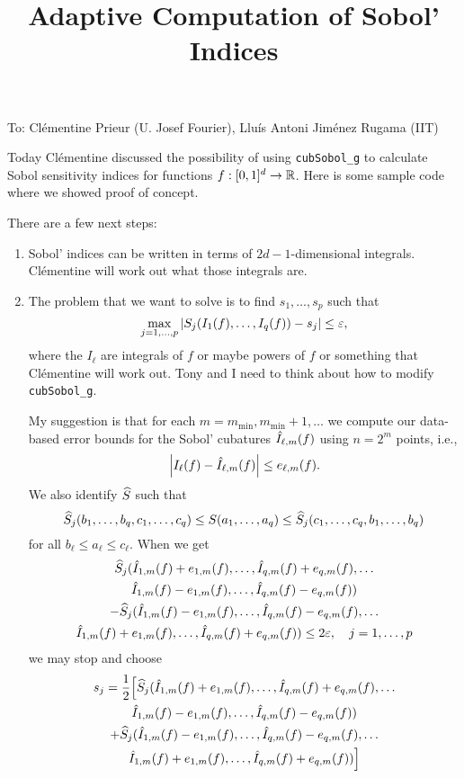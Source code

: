 \documentclass[]{amsart}
\newcommand{\oerr}{e}
\begin{document}
\title{Adaptive Computation of Sobol' Indices}
\maketitle

\noindent To:  Cl\'ementine Prieur (U. Josef Fourier), Llu\'is Antoni Jim\'enez Rugama (IIT)

\bigskip

Today Cl\'ementine discussed the possibility of using \texttt{cubSobol\_g} to calculate Sobol sensitivity indices for functions $f : [0,1]^d \to \mathbb{R}$.  Here is some sample code where we showed proof of concept.



There are a few next steps: 

\begin{enumerate}
\item Sobol' indices can be written in terms of $2d-1$-dimensional integrals.   Cl\'ementine will work out what those integrals are.

\item The problem that we want to solve is to find $s_1, \ldots, s_p$ such that 
\[
\max_{j=1, \ldots, p} \left \lvert S_j(I_1(f), \ldots, I_q(f)) - s_j \right \rvert \le \varepsilon,
\]
 where the $I_\ell$ are integrals of $f$ or maybe powers of $f$ or something that Cl\'ementine will work out.  Tony and I need to think about how to modify \texttt{cubSobol\_g}.
 
My suggestion is that for each $m = m_{\min}, m_{\min}+1, \ldots$ we compute our data-based error bounds for the Sobol' cubatures $\hat{I}_{\ell,m}(f)$ using $n=2^m$ points, i.e., 
\[
\abs{I_\ell(f) - \hI_{\ell,m}(f)} \le \oerr_{\ell,m}(f).
\]
We also identify $\widehat{S}$ such that 
\[
\widehat{S}_j(b_1, \ldots, b_q, c_1, \ldots, c_q) \le S(a_1, \ldots, a_q) \le \widehat{S}_j(c_1, \ldots, c_q, b_1, \ldots, b_q) 
\]
for all $b_\ell \le a_\ell \le c_\ell$.  When we get 
\begin{multline*}
\hS_j(\hI_{1,m}(f) + \oerr_{1,m}(f), \ldots,\hI_{q,m}(f) + \oerr_{q,m}(f), \ldots \\
\hI_{1,m}(f) - \oerr_{1,m}(f), \ldots,\hI_{q,m}(f) - \oerr_{q,m}(f)) \\
 - \hS_j(\hI_{1,m}(f) - \oerr_{1,m}(f), \ldots,\hI_{q,m}(f) - \oerr_{q,m}(f), \ldots \\
 \hI_{1,m}(f) + \oerr_{1,m}(f), \ldots,\hI_{q,m}(f) + \oerr_{q,m}(f))   \le 2\varepsilon, \quad j = 1, \ldots, p
\end{multline*}
we may stop and choose 
\begin{multline*}
s_j = \frac{1}{2}\Bigl[\hS_j(\hI_{1,m}(f) + \oerr_{1,m}(f), \ldots,\hI_{q,m}(f) + \oerr_{q,m}(f), \ldots \\
\hI_{1,m}(f) - \oerr_{1,m}(f), \ldots,\hI_{q,m}(f) - \oerr_{q,m}(f)) \\
+ \hS_j(\hI_{1,m}(f) - \oerr_{1,m}(f), \ldots,\hI_{q,m}(f) - \oerr_{q,m}(f), \ldots \\
 \hI_{1,m}(f) + \oerr_{1,m}(f), \ldots,\hI_{q,m}(f) + \oerr_{q,m}(f)) \Bigr]
 \end{multline*}
 

\end{enumerate}
\end{document}
